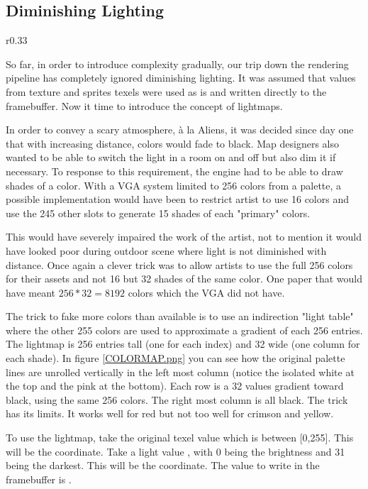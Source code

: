 \subsection{Diminishing Lighting}
\label{diminishedlightning}
\begin{wrapfigure}[11]{r}{0.33\textwidth}
\centering
{}
\end{wrapfigure}
So far, in order to introduce complexity gradually, our trip down the rendering pipeline has completely ignored diminishing lighting. It was assumed that values from texture and sprites texels were used as is and written directly to the framebuffer. Now it time to introduce the concept of lightmaps.\\
\par
In order to convey a scary atmosphere, \`a la Aliens, it was decided since day one that with increasing distance, colors would fade to black. Map designers also wanted to be able to switch the light in a room on and off but also dim it if necessary. To response to this requirement, the engine had to be able to draw shades of a color. With a VGA system limited to 256 colors from a palette, a possible implementation would have been to restrict artist to use 16 colors and use the 245 other slots to generate 15 shades of each "primary" colors.\\
\par
This would have severely impaired the work of the artist, not to mention it would have looked poor during outdoor scene where light is not diminished with distance. Once again a clever trick was to allow artists to use the full 256 colors for their assets and not 16 but 32 shades of the same color. One paper that would have meant $256 * 32 = 8192$ colors which the VGA did not have.\\
\par
 The trick to fake more colors than available is to use an indirection "light table" where the other 255 colors are used to approximate a gradient of each 256 entries. The lightmap is 256 entries tall (one for each index) and 32 wide (one column for each shade). In figure \ref{COLORMAP.png} you can see how the original palette lines are unrolled vertically in the left most column (notice the isolated white at the top and the pink at the bottom). Each row is a 32 values gradient toward black, using the same 256 colors. The right most column is all black. The trick has its limits. It works well for red but not too well for crimson and yellow.\\
 \par
 To use the lightmap, take the original texel value  which is between [0,255]. This will be the  coordinate. Take a light value , with 0 being the brightness and 31 being the darkest. This will be the  coordinate. The value to write in the framebuffer is .\\
 \par
{}





